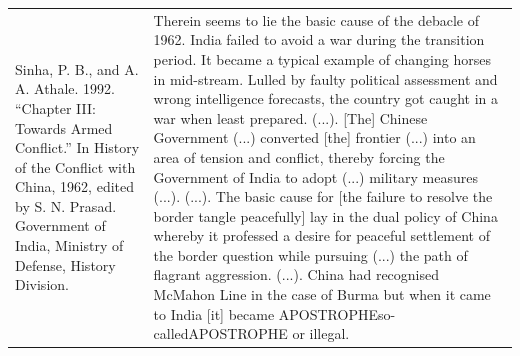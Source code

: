 {\begin{longtable}{p{}p{}}
\\
Sinha, P. B., and A. A. Athale. 1992. “Chapter III: Towards Armed Conflict.” In History of the Conflict with China, 1962, edited by S. N. Prasad. Government of India, Ministry of Defense, History Division. & Therein seems to lie the basic cause of the debacle of 1962. India failed to avoid a war during the transition period. It became a typical example of changing horses in mid-stream. Lulled by faulty political assessment and wrong intelligence forecasts, the country got caught in a war when least prepared. (...).  [The] Chinese Government (...) converted [the] frontier (...) into an area of tension and conflict, thereby forcing the Government of India to adopt (...) military measures (...). (...). The basic cause for [the failure to resolve the border tangle peacefully] lay in the dual policy of China whereby it professed a desire for peaceful settlement of the border question while pursuing (...) the path of flagrant aggression. (...). China had recognised McMahon Line in the case of Burma but when it came to India [it] became  APOSTROPHEso-calledAPOSTROPHE or illegal.


\end{longtable}}
